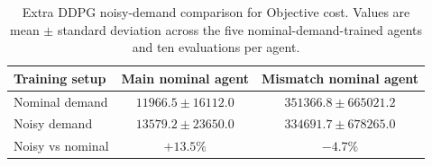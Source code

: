 \begin{table}[htbp]
\centering
\caption{Extra DDPG noisy-demand comparison for Objective cost. Values are mean $\pm$ standard deviation across the five nominal-demand-trained agents and ten evaluations per agent.}
\label{tab:extra_obj_comparison}
\begin{tabular}{lcc}
\toprule
Training setup & Main nominal agent & Mismatch nominal agent \\
\midrule
Nominal demand & $11966.5 \pm 16112.0$ & $351366.8 \pm 665021.2$ \\
Noisy demand & $13579.2 \pm 23650.0$ & $334691.7 \pm 678265.0$ \\
\midrule
Noisy vs nominal & $+13.5\%$ & $-4.7\%$ \\
\bottomrule
\end{tabular}
\end{table}
